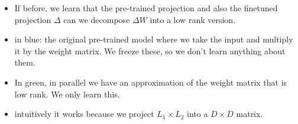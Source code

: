\documentclass[11pt]{article}
\begin{document}
\begin{minipage}[l]{.5\linewidth}
    \begin{figure}[H]
        \centering
    \end{figure}    
\end{minipage}\hfill
\begin{minipage}[r]{.48\linewidth}
    \begin{itemize}
        \item If before, we learn that the pre-trained projection and also the finetuned projection $\Delta$ can we decompose $\Delta W$ into a low rank version. 
        \item in blue: the original pre-trained model where we take the input and multiply it by the weight matrix. We freeze these, so we don't learn anything about them.
        \item In green, in parallel we have an approximation of the weight matrix that is low rank. We only learn this.
        \item intuitively it works because we project $L_1 \times L_2$ into a $D \times D$ matrix.
    \end{itemize}
\end{minipage}
\end{document}
